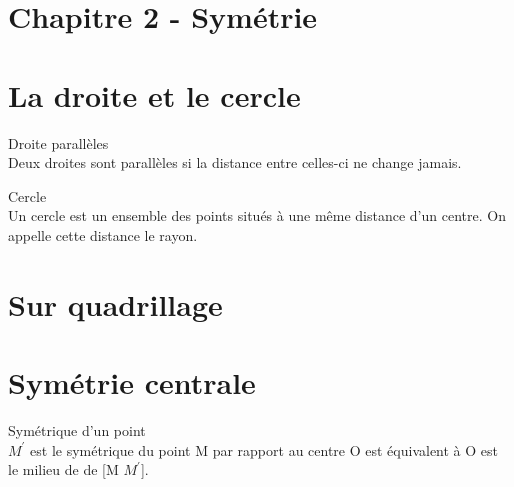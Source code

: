 



\horrule{2px}
\section*{Chapitre 2 - Symétrie}
\horrule{2px}

\section*{La droite et le cercle}

\begin{Definition}{Droite parallèles}\\
  Deux droites sont parallèles si la distance entre celles-ci ne change jamais. 
\end{Definition}

\begin{Definition}{Cercle}\\
  Un cercle est  un ensemble des points situés à une même distance d'un centre. On appelle cette distance le rayon.
\end{Definition}

\section*{Sur quadrillage}


\section*{Symétrie centrale}

\begin{Definition}{Symétrique d'un point}\\
  \label{def:ch2-1.sympt}
  $M^{'}$ est le symétrique du point M par rapport au centre O est équivalent à O est le milieu de de [M $M^{'}$].
\end{Definition}


